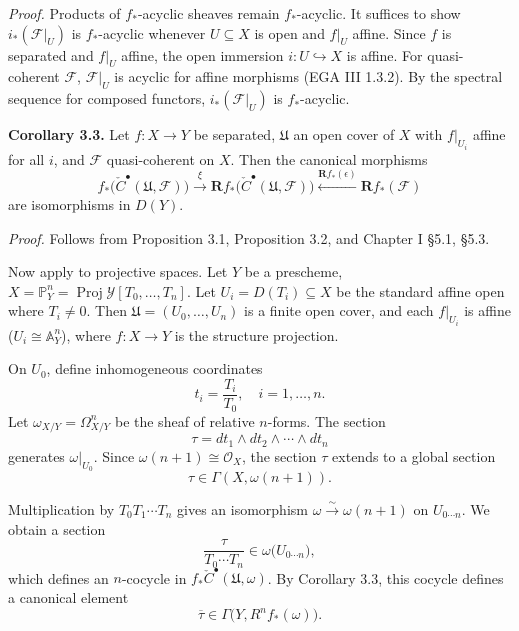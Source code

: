 \setcounter{page}{150}
\textit{Proof.}
Products of $f_*$-acyclic sheaves remain $f_*$-acyclic.
It suffices to show $i_*(\mathcal{F}|_U)$ is $f_*$-acyclic whenever $U\subseteq X$ is open and $f|_U$ affine.
Since $f$ is separated and $f|_U$ affine, the open immersion $i\colon U\hookrightarrow X$ is affine.
For quasi-coherent $\mathcal{F}$, $\mathcal{F}|_U$ is acyclic for affine morphisms (EGA III 1.3.2).
By the spectral sequence for composed functors, $i_*(\mathcal{F}|_U)$ is $f_*$-acyclic.

\textbf{Corollary 3.3.}
Let $f\colon X\to Y$ be separated, $\mathfrak{U}$ an open cover of $X$ with $f|_{U_i}$ affine for all $i$, and $\mathcal{F}$ quasi-coherent on $X$.
Then the canonical morphisms
\[
f_*\big(\check{C}^\bullet(\mathfrak{U},\mathcal{F})\big)
\xrightarrow{\xi} \mathbf{R}f_*\big(\check{C}^\bullet(\mathfrak{U},\mathcal{F})\big)
\xleftarrow{\mathbf{R}f_*(\epsilon)} \mathbf{R}f_*(\mathcal{F})
\]
are isomorphisms in $D(Y)$.

\textit{Proof.}
Follows from Proposition 3.1, Proposition 3.2, and Chapter I §5.1, §5.3.

\setcounter{page}{151}
Now apply to projective spaces.
Let $Y$ be a prescheme, $X=\mathbb{P}^n_Y = \operatorname{Proj}\mathcal{Y}[T_0,\dots,T_n]$.
Let $U_i = D(T_i)\subseteq X$ be the standard affine open where $T_i\neq 0$.
Then $\mathfrak{U}=(U_0,\dots,U_n)$ is a finite open cover, and each $f|_{U_i}$ is affine ($U_i\cong\mathbb{A}^n_Y$), where $f\colon X\to Y$ is the structure projection.

On $U_0$, define inhomogeneous coordinates
\[
t_i = \frac{T_i}{T_0},\quad i=1,\dots,n.
\]
Let $\omega_{X/Y} = \Omega^n_{X/Y}$ be the sheaf of relative $n$-forms.
The section
\[
\tau = dt_1\wedge dt_2\wedge\cdots\wedge dt_n
\]
generates $\omega|_{U_0}$.
Since $\omega(n+1)\cong\mathcal{O}_X$, the section $\tau$ extends to a global section
\[
\tau\in\Gamma(X,\omega(n+1)).
\]

\setcounter{page}{152}
Multiplication by $T_0T_1\cdots T_n$ gives an isomorphism $\omega\xrightarrow{\sim}\omega(n+1)$ on $U_{0\cdots n}$.
We obtain a section
\[
\frac{\tau}{T_0\cdots T_n} \in \omega\big(U_{0\cdots n}\big),
\]
which defines an $n$-cocycle in $f_*\check{C}^\bullet(\mathfrak{U},\omega)$.
By Corollary 3.3, this cocycle defines a canonical element
\[
\overline{\tau} \in \Gamma\big(Y,R^n f_*(\omega)\big).
\]

